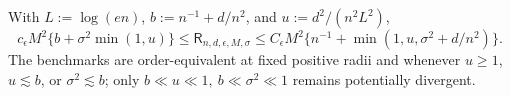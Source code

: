 With \(L:=\log(en)\), \(b:=n^{-1}+d/n^2\), and \(u:=d^2/(n^2L^2)\),
\[
 c_{\epsilon}M^2\{b+\sigma^2\min(1,u)\}
 \le\mathsf R_{n,d,\epsilon,M,\sigma}
 \le C_{\epsilon}M^2\{n^{-1}+\min(1,u,\sigma^2+d/n^2)\}.
\]
The benchmarks are order-equivalent at fixed positive radii and whenever \(u\ge1\), \(u\lesssim b\), or \(\sigma^2\lesssim b\); only \(b\ll u\ll1,\ b\ll\sigma^2\ll1\) remains potentially divergent.